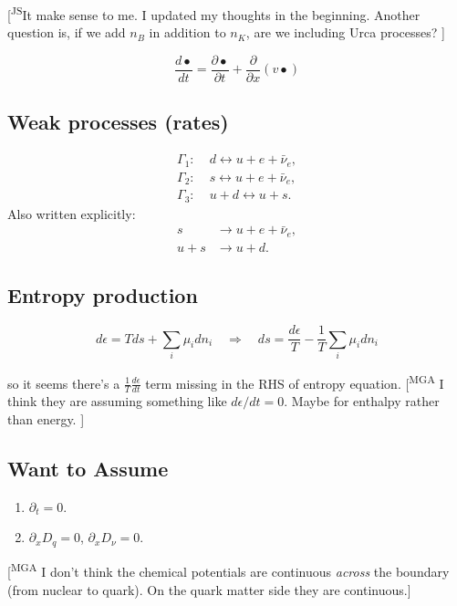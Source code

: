 \documentclass[11pt]{article}
\newcommand{\mgacom}[1]{\textsf{\color[rgb]{0.75,0,0}[\textsuperscript{MGA} #1]}}
\newcommand{\JScom}[1]{\textsf{\color{violet} [\textsuperscript{JS}#1]}}
\begin{document}
\JScom{It make sense to me. I updated my thoughts in the beginning. 
Another question is, if we add $n_B$ in addition to $n_K$, are we including Urca processes? }




\begin{equation}
\boxed{
    \frac{d\bullet}{dt} = \frac{\partial \bullet}{\partial t} + \frac{\partial }{\partial x}(v\bullet)
}
\end{equation}

\subsection{Weak processes (rates)}
\begin{align}
\Gamma_1:\;& d \leftrightarrow u + e + \bar{\nu}_e,
\\
\Gamma_2:\;& s \leftrightarrow u + e + \bar{\nu}_e,
\\
\Gamma_3:\;& u + d \leftrightarrow u + s.
\end{align}
Also written explicitly:
\begin{align}
s &\to u + e + \bar{\nu}_e,
\\
u+s &\to u+d.
\end{align}

\subsection{Entropy production}

\begin{equation}
d\epsilon = Tds + \sum_i\mu_i dn_i \quad \Rightarrow \quad ds = \frac{d\epsilon}{T} - \frac{1}{T}\sum_i \mu_i dn_i
\end{equation}

so it seems there's a $\frac{1}{T}\frac{d\epsilon}{dt}$ term missing in the RHS of entropy equation. 
\mgacom{I think they are assuming something like $d\epsilon/dt=0$. Maybe for enthalpy rather than energy.  }
\subsection{Want to Assume}
\begin{enumerate}
\item $\partial_t = 0$.
\item $\partial_x D_q = 0$, \qquad $\partial_x D_\nu = 0$.
\end{enumerate}
\mgacom{I don't think the chemical potentials are continuous {\em across} the boundary (from nuclear to quark). On the quark matter side they are continuous.}
\end{document}
